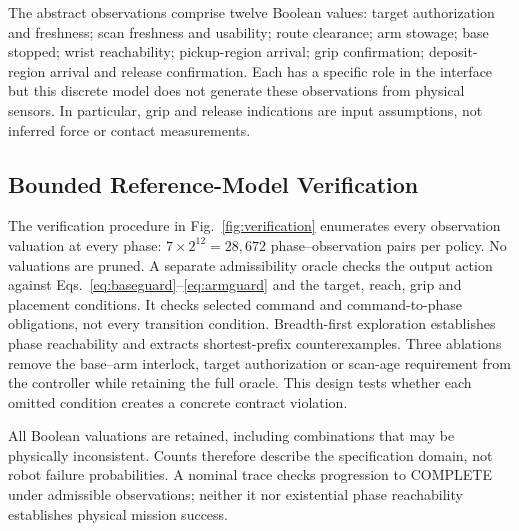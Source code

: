 The abstract observations comprise twelve Boolean values: target authorization and freshness; scan freshness and usability; route clearance; arm stowage; base stopped; wrist reachability; pickup-region arrival; grip confirmation; deposit-region arrival and release confirmation. Each has a specific role in the interface but this discrete model does not generate these observations from physical sensors. In particular, grip and release indications are input assumptions, not inferred force or contact measurements.

\subsection{Bounded Reference-Model Verification}
The verification procedure in Fig.~\ref{fig:verification} enumerates every observation valuation at every phase: $7\times2^{12}=28{,}672$ phase--observation pairs per policy. No valuations are pruned. A separate admissibility oracle checks the output action against Eqs.~\ref{eq:baseguard}--\ref{eq:armguard} and the target, reach, grip and placement conditions. It checks selected command and command-to-phase obligations, not every transition condition. Breadth-first exploration establishes phase reachability and extracts shortest-prefix counterexamples. Three ablations remove the base--arm interlock, target authorization or scan-age requirement from the controller while retaining the full oracle. This design tests whether each omitted condition creates a concrete contract violation.

All Boolean valuations are retained, including combinations that may be physically inconsistent. Counts therefore describe the specification domain, not robot failure probabilities. A nominal trace checks progression to COMPLETE under admissible observations; neither it nor existential phase reachability establishes physical mission success.

\HazBotVerificationFigure

